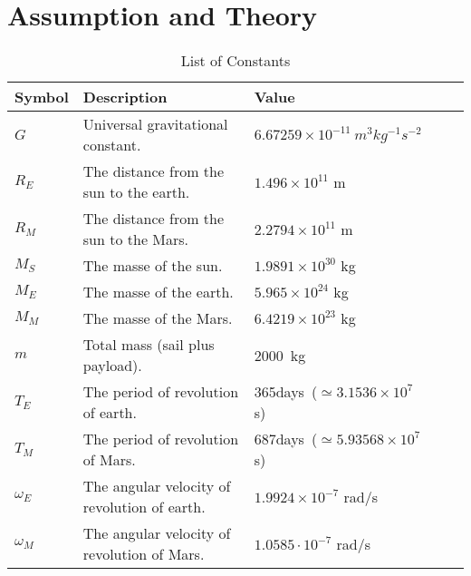 \documentclass[../Paper.tex]{subfiles}
\begin{document}
\section{Assumption and Theory}

\renewcommand\arraystretch{1.5} %
\begin{table}[H]
\centering
\scriptsize %
\begin{tabular}{p{2cm}<{\centering} p{5cm}<{\centering} p{3cm}<{\centering} %
				p{1cm}<{\centering} p{1cm}<{\centering} }
		\hline
Symbol & Description & Value \\
	    \hline
	    \hline 
$G$ & Universal gravitational constant. & $6.67259\times10^{-11}~m^3kg^{-1}s^{-2}$ \\

$R_E$ & The distance from the sun to the earth. & $1.496\times10^{11}$ m \\
		
$R_M$ & The distance from the sun to the Mars. & $2.2794\times10^{11}$ m \\

$M_S$ & The masse of the sun. & $1.9891\times10^{30}$ kg \\

$M_E$ & The masse of the earth. & $5.965\times10^{24}$ kg \\

$M_M$ & The masse of the Mars. & $6.4219\times10^{23}$ kg \\

$m$ & Total mass (sail plus payload). & 2000~kg \\

$T_E$ & The period of revolution of earth. & 365days~($\simeq3.1536\times10^{7}$ s) \\

$T_M$ & The period of revolution of Mars. & 687days~($\simeq5.93568\times10^{7}$ s)\\

$\omega_E$ & The angular velocity of revolution of earth.& $1.9924\times10^{-7}$ rad/s \\

$\omega_M$ & The angular velocity of revolution of Mars. & $1.0585\cdot10^{-7}$ rad/s \\
	    \hline
\end{tabular}

\caption{ List of Constants}
\label{Table1}
\end{table}
\end{document}
